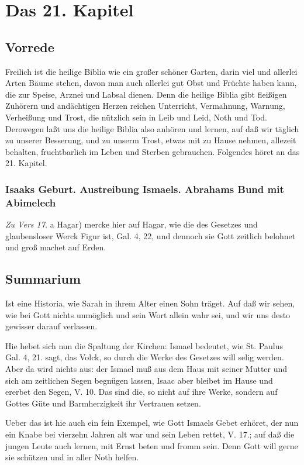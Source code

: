 \chapter{Das 21. Kapitel}

\section{Vorrede}

Freilich ist die heilige Biblia wie ein großer schöner Garten, darin viel und allerlei Arten Bäume stehen, davon man auch allerlei gut Obst und Früchte haben kann, die zur Speise, Arznei und Labsal dienen. Denn die heilige Biblia gibt fleißigen Zuhörern und andächtigen Herzen reichen Unterricht, Vermahnung, Warnung, Verheißung und Trost, die nützlich sein in Leib und Leid, Noth und Tod. Derowegen laßt uns die heilige Biblia also anhören und lernen, auf daß wir täglich zu unserer Besserung, und zu unserm Trost, etwas mit zu Hause nehmen, allezeit behalten, fruchtbarlich im Leben und Sterben gebrauchen. Folgendes höret an das 21. Kapitel.

\subsection{Isaaks Geburt. Austreibung Ismaels. Abrahams Bund mit Abimelech}

\emph{Zu Vers 17.} a Hagar) mercke hier auf Hagar, wie die des Gesetzes und glaubensloser Werck Figur ist, Gal. 4, 22, und dennoch sie Gott zeitlich belohnet und groß machet auf Erden.

\section{Summarium}

Ist eine Historia, wie Sarah in ihrem Alter einen Sohn träget. Auf daß wir sehen, wie bei Gott nichts unmöglich und sein Wort allein wahr sei, und wir uns desto gewisser darauf verlassen.

Hie hebet sich nun die Spaltung der Kirchen: Ismael bedeutet, wie St. Paulus Gal. 4, 21. sagt, das Volck, so durch die Werke des Gesetzes will selig werden. Aber da wird nichts aus: der Ismael muß aus dem Haus mit seiner Mutter und sich am zeitlichen Segen begnügen lassen, Isaac aber bleibet im Hause und ererbet den Segen, V. 10. Das sind die, so nicht auf ihre Werke, sondern auf Gottes Güte und Barmherzigkeit ihr Vertrauen setzen.

Ueber das ist hie auch ein fein Exempel, wie Gott Ismaels Gebet erhöret, der nun ein Knabe bei vierzehn Jahren alt war und sein Leben rettet, V. 17.; auf daß die jungen Leute auch lernen, mit Ernst beten und fromm sein. Denn Gott will gerne sie schützen und in aller Noth helfen.

